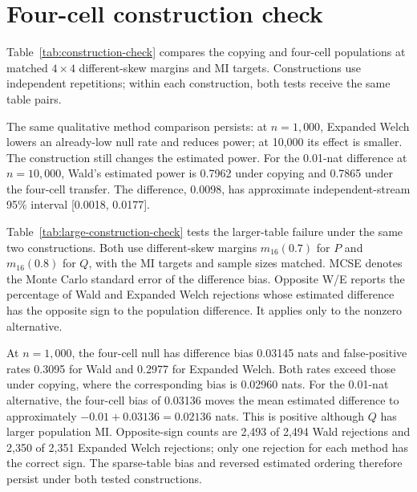 \section{Four-cell construction check}


Table~\ref{tab:construction-check} compares the copying and four-cell
populations at matched \(4\times4\) different-skew margins and MI
targets. Constructions use independent repetitions; within each
construction, both tests receive the same table pairs.

\begin{table}[H]
\centering
\small
\caption{Rejection and difference bias under two population constructions.}
\label{tab:construction-check}

\end{table}

The same qualitative method comparison persists: at \(n=1{,}000\),
Expanded Welch lowers an already-low null rate and reduces power;
at 10,000 its effect is smaller. The construction still changes the
estimated power. For the 0.01-nat difference at \(n=10{,}000\),
Wald's estimated power is 0.7962 under copying and 0.7865 under the four-cell
transfer. The difference, 0.0098, has approximate independent-stream
95\% interval [0.0018, 0.0177].

\medskip
{}

Table~\ref{tab:large-construction-check} tests the larger-table failure
under the same two constructions. Both use different-skew margins
\(m_{16}(0.7)\) for \(P\) and \(m_{16}(0.8)\) for \(Q\), with
the MI targets and sample sizes matched. MCSE denotes the Monte Carlo
standard error of the difference bias. Opposite W/E reports the percentage of Wald and Expanded Welch
rejections whose estimated difference has the opposite sign to the
population difference. It applies only to the nonzero alternative.

\begin{table}[H]
\centering
\small
\caption{Matched \(16\times16\) comparisons under two constructions.}
\label{tab:large-construction-check}
\setlength{\tabcolsep}{4.5pt}

\end{table}

At \(n=1{,}000\), the four-cell null has difference bias
0.03145 nats and false-positive rates 0.3095 for Wald and 0.2977 for
Expanded Welch. Both rates exceed those under copying, where the
corresponding bias is 0.02960 nats. For the 0.01-nat alternative,
the four-cell bias of 0.03136 moves the mean estimated difference to
approximately \(-0.01+0.03136=0.02136\) nats. This is positive
although \(Q\) has larger population MI. Opposite-sign counts are
2,493 of 2,494 Wald rejections and 2,350 of 2,351 Expanded Welch
rejections; only one rejection for each method has the correct sign.
The sparse-table bias and reversed estimated ordering therefore persist
under both tested constructions.

